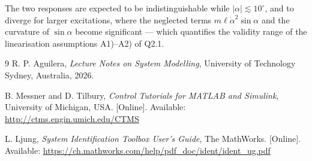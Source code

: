 \documentclass[11pt,a4paper]{article}
\newcommand{\dd}[1]{\dot{#1}}
\renewcommand{\l}{\ell}
\begin{document}
The two responses are expected to be indistinguishable while
$|\alpha| \lesssim 10^\circ$, and to diverge for larger excitations, where
the neglected terms $m\l\dd\alpha^{2}\sin\alpha$ and the curvature of
$\sin\alpha$ become significant --- which quantifies the validity range of
the linearisation assumptions A1)--A2) of Q2.1.

\begin{thebibliography}{9}
R. P. Aguilera, \emph{Lecture Notes on System Modelling}, University of
Technology Sydney, Australia, 2026.

B. Messner and D. Tilbury, \emph{Control Tutorials for MATLAB and Simulink},
University of Michigan, USA. [Online]. Available:
\url{http://ctms.engin.umich.edu/CTMS}

L. Ljung, \emph{System Identification Toolbox User's Guide}, The MathWorks.
[Online]. Available:
\url{https://ch.mathworks.com/help/pdf_doc/ident/ident_ug.pdf}
\end{thebibliography}
\end{document}
